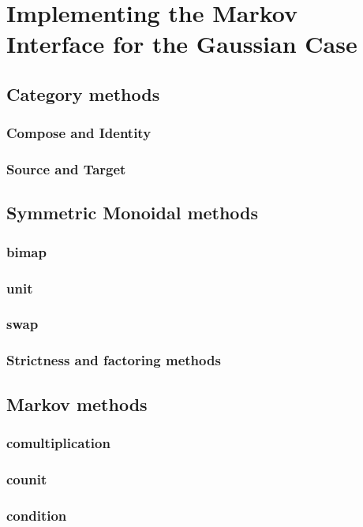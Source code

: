 \section{Implementing the Markov Interface for the Gaussian Case}
    \subsection{Category methods}
	\subsubsection{Compose and Identity}
	\subsubsection{Source and Target}
    \subsection{Symmetric Monoidal methods}
	\subsubsection{bimap}
	\subsubsection{unit}
	\subsubsection{swap}
	\subsubsection{Strictness and factoring methods}
    \subsection{Markov methods}
	\subsubsection{comultiplication}
	\subsubsection{counit}
	\subsubsection{condition}
